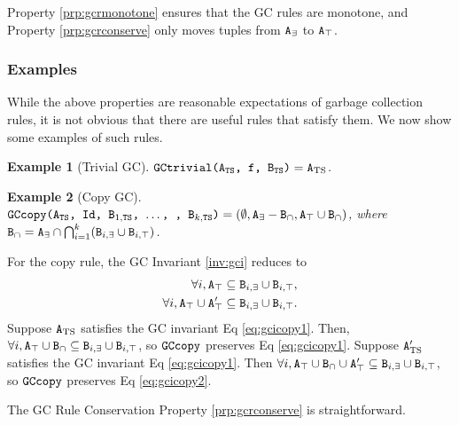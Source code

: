 \documentclass[10pt]{proc}
\newtheorem{example}{Example}[section]
\renewcommand{\tt}[1]{\ifmmode\text{\texttt{#1}}\else\texttt{#1}\fi}
\begin{document}
Property \ref{prp:gcrmonotone} ensures that the GC rules are monotone, and Property \ref{prp:gcrconserve} only moves tuples from $\tt{A}_\exists$ to $\tt{A}_\top$.

\subsubsection{Examples}
While the above properties are reasonable expectations of garbage collection rules, it is not obvious that there are useful rules that satisfy them.
We now show some examples of such rules.

\begin{example}[Trivial GC]
$\tt{GCtrivial(A$_\text{TS}$, f, B$_\text{TS}$)} = \tt{A}_\text{TS}$.
\end{example}

\begin{example}[Copy GC]
$\tt{GCcopy(A$_\text{TS}$, Id, B$_{1,\text{TS}}$, $\dots$, , B$_{k,\text{TS}}$)} = (\emptyset, \tt{A}_\exists - \tt{B}_\cap, \tt{A}_\top \cup \tt{B}_\cap)$, where $\tt{B}_\cap = \tt{A}_\exists \cap \bigcap_{i=1}^k (\tt{B}_{i,\exists} \cup \tt{B}_{i,\top})$.
\end{example}

For the copy rule, the GC Invariant \ref{inv:gci} reduces to 
\begin{align}
\forall i, \tt{A}_\top &\subseteq \tt{B}_{i,\exists} \cup \tt{B}_{i,\top},\label{eq:gcicopy1}\\
\forall i, \tt{A}_\top \cup \tt{A}_\top' &\subseteq \tt{B}_{i,\exists} \cup \tt{B}_{i,\top}.\label{eq:gcicopy2}
\end{align}
Suppose $\tt{A}_\text{TS}$ satisfies the GC invariant Eq \eqref{eq:gcicopy1}.
Then, $\forall i, \tt{A}_\top \cup \tt{B}_\cap \subseteq \tt{B}_{i,\exists} \cup \tt{B}_{i,\top}$, so $\tt{GCcopy}$ preserves Eq \eqref{eq:gcicopy1}.
Suppose $\tt{A}_\text{TS}'$ satisfies the GC invariant Eq \eqref{eq:gcicopy1}.
Then $\forall i, \tt{A}_\top \cup \tt{B}_\cap \cup \tt{A}_\top' \subseteq \tt{B}_{i,\exists} \cup \tt{B}_{i,\top}$, so $\tt{GCcopy}$ preserves Eq \eqref{eq:gcicopy2}.

The GC Rule Conservation Property \ref{prp:gcrconserve} is straightforward.
\end{document}
